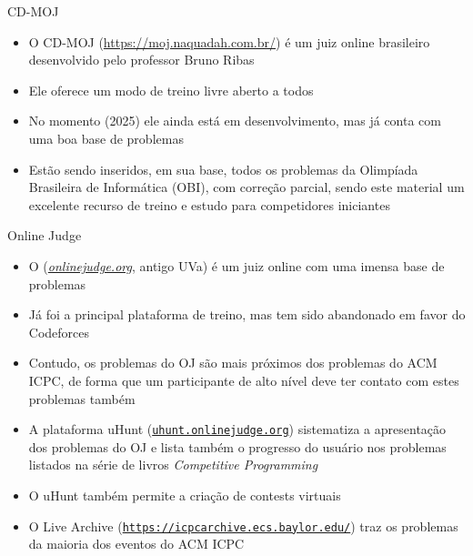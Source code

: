 \begin{frame}[fragile]{CD-MOJ}

    \begin{itemize}
        \item O CD-MOJ (\url{https://moj.naquadah.com.br/}) é um juiz online brasileiro desenvolvido
            pelo professor Bruno Ribas

        \item Ele oferece um modo de treino livre aberto a todos

        \item No momento (2025) ele ainda está em desenvolvimento, mas já conta com uma boa base de
            problemas

        \item Estão sendo inseridos, em sua base, todos os problemas da Olimpíada Brasileira de 
            Informática (OBI), com correção parcial, sendo este material um excelente recurso de
            treino e estudo para competidores iniciantes

    \end{itemize}

\end{frame}


\begin{frame}[fragile]{Online Judge}

    \begin{itemize}
        \item O (\textit{\url{onlinejudge.org}}, antigo UVa) é um juiz online com uma imensa base de
            problemas

        \item Já foi a principal plataforma de treino, mas tem sido abandonado em favor do
            Codeforces

        \item Contudo, os problemas do OJ são mais próximos dos problemas do ACM ICPC,
            de forma que um participante de alto nível deve ter contato com estes problemas
            também

        \item A plataforma uHunt (\texttt{\url{uhunt.onlinejudge.org}}) sistematiza a apresentação
            dos problemas do OJ e lista também o progresso do usuário nos problemas listados
            na série de livros \textit{Competitive Programming}

        \item O uHunt também permite a criação de contests virtuais

        \item O Live Archive (\texttt{\url{https://icpcarchive.ecs.baylor.edu/}}) traz os problemas
            da maioria dos eventos do ACM ICPC
    \end{itemize}

\end{frame}

